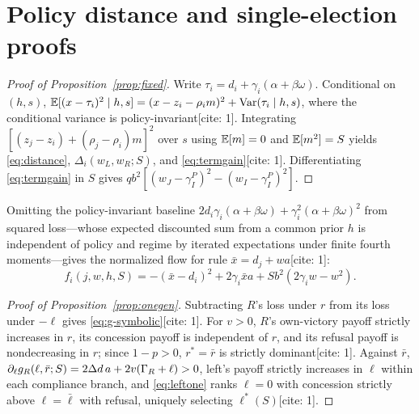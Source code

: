 \clearpage
\appendix
\linespread{1.045}\selectfont

\section{Policy distance and single-election proofs}\label{app:one}

\begin{proof}[Proof of Proposition~\ref{prop:fixed}]
Write $\tau_i=d_i+\gamma_i(\alpha+\beta\omega)$. Conditional on $(h,s)$, $\mathbb E[(x-\tau_i)^2\mid h,s]=(x-z_i-\rho_i m)^2+\operatorname{Var}(\tau_i\mid h,s)$, where the conditional variance is policy-invariant[cite: 1]. Integrating $[(z_j-z_i)+(\rho_j-\rho_i)m]^2$ over $s$ using $\mathbb E[m]=0$ and $\mathbb E[m^2]=S$ yields \eqref{eq:distance}, $\Delta_i(w_L,w_R;S)$, and \eqref{eq:termgain}[cite: 1]. Differentiating \eqref{eq:termgain} in $S$ gives $qb^2[(w_J-\gamma_I^P)^2-(w_I-\gamma_I^P)^2]$.
\end{proof}

Omitting the policy-invariant baseline $2d_i\gamma_i(\alpha+\beta\omega)+\gamma_i^2(\alpha+\beta\omega)^2$ from squared loss---whose expected discounted sum from a common prior $h$ is independent of policy and regime by iterated expectations under finite fourth moments---gives the normalized flow for rule $\bar x=d_j+wa$[cite: 1]:
\begin{equation}
 f_i(j,w,h,S)=-(\bar x-d_i)^2+2\gamma_i\bar x a
                    +S b^2(2\gamma_i w-w^2).
 \label{eq:flow}
\end{equation}

\begin{proof}[Proof of Proposition~\ref{prop:onegen}]
Subtracting $R$'s loss under $r$ from its loss under $-\ell$ gives \eqref{eq:g-symbolic}[cite: 1]. For $v>0$, $R$'s own-victory payoff strictly increases in $r$, its concession payoff is independent of $r$, and its refusal payoff is nondecreasing in $r$; since $1-p>0$, $r^*=\bar r$ is strictly dominant[cite: 1]. Against $\bar r$, $\partial_\ell g_R(\ell,\bar r;S)=2\Delta d\,a+2v(\Gamma_R+\ell)>0$, left's payoff strictly increases in $\ell$ within each compliance branch, and \eqref{eq:leftone} ranks $\ell=0$ with concession strictly above $\ell=\bar\ell$ with refusal, uniquely selecting $\ell^*(S)$[cite: 1].
\end{proof}

